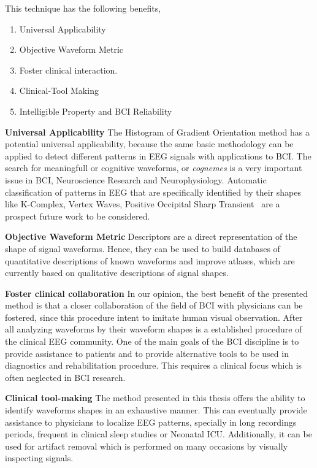 \vspace{5pt}

This technique has the following benefits,

\begin{enumerate}
\item Universal Applicability
\item Objective Waveform Metric
\item Foster clinical interaction.
\item Clinical-Tool Making
\item Intelligible Property and BCI Reliability
\end{enumerate}

\textbf{Universal Applicability}
The Histogram of Gradient Orientation method has a potential universal applicability, because the same basic methodology can be applied to detect different patterns in EEG signals with applications to BCI.   The search for meaningfull or cognitive waveforms, or \textit{cognemes} is a very important issue in BCI, Neuroscience Research and Neurophysiology. Automatic classification of patterns in EEG that are specifically identified by their shapes like K-Complex, Vertex Waves, Positive Occipital Sharp Transient~\cite{Hartman2005} are a prospect future work to be considered. 


\textbf{Objective Waveform Metric}
Descriptors are a direct representation of the shape of signal waveforms. Hence,  they can be used to build databases of quantitative descriptions of known waveforms and improve atlases, which are currently based on qualitative descriptions of signal shapes.

\textbf{Foster clinical collaboration}
In our opinion, the best benefit of the presented method is that a closer collaboration of the field of BCI with physicians can be fostered, since this procedure intent to imitate human visual observation. After all analyzing waveforms by their waveform shapes is a established procedure of the clinical EEG community. One of the main goals of the BCI discipline is to provide assistance to patients and to provide alternative tools to be used in diagnostics and rehabilitation procedure.  This requires a clinical focus which is often neglected in BCI research. 

\textbf{Clinical tool-making}
The method presented in this thesis offers the ability to identify waveforms shapes in an exhaustive manner.  This can eventually provide assistance to physicians to localize EEG patterns, specially in long recordings periods, frequent in clinical sleep studies or Neonatal ICU.  Additionally, it can be used for artifact removal which is performed on many occasions by visually inspecting signals. %


